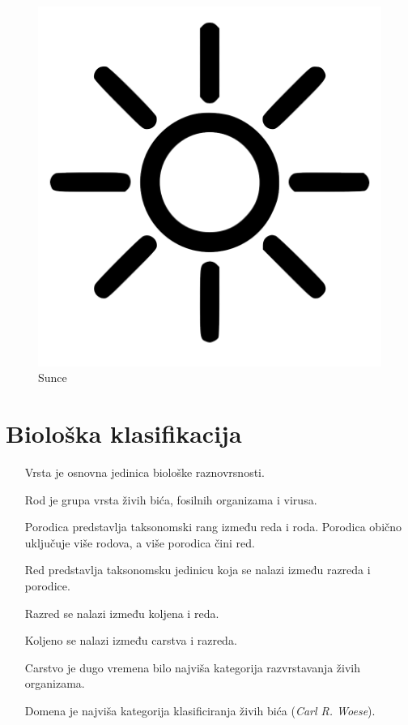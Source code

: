 \documentclass[12pt]{scrartcl}
\begin{document}
\begin{figure}[ht]
\caption{Sunce}
\begin{center}
\includegraphics[scale=0.1]{sunce}
\end{center}
\label{fig:sunce} 
\end{figure}

\section{Biološka klasifikacija}
\begin{itemize}
\item[Vrsta] je osnovna jedinica biološke raznovrsnosti.
\item[Rod] je grupa vrsta živih bića, fosilnih organizama i virusa.
\item[Porodica] predstavlja taksonomski rang između reda i roda. Porodica obično uključuje više rodova, a više porodica čini red.
\item[Red] predstavlja taksonomsku jedinicu koja se nalazi između razreda i porodice.
\item[Razred] se nalazi između koljena i reda.
\item[Koljeno] se nalazi između carstva i razreda.
\item[Carstvo] je dugo vremena bilo najviša kategorija razvrstavanja živih organizama. 
\item[Domena] je najviša kategorija klasificiranja živih bića (\textsl{Carl R. Woese}).
\end{itemize}
\end{document}
